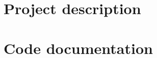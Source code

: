 \documentclass[a4paper,oneside]{report}
\begin{document}
\hypersetup{pageanchor=false}
\tableofcontents
{}
\hypersetup{pageanchor=true}

\part{Project description}






\part{Code documentation}

\end{document}
